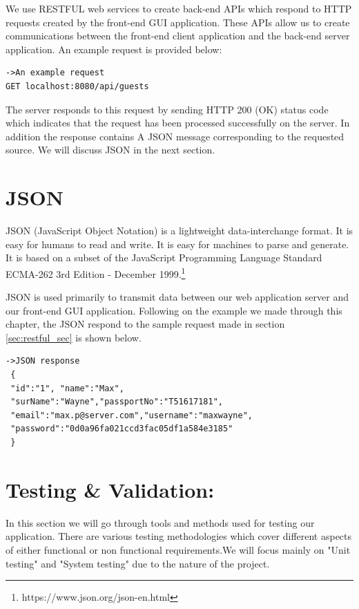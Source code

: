 We use RESTFUL web services to create back-end APIs which respond to HTTP requests created by the front-end GUI application. These APIs allow us to create communications between the front-end client application and the back-end server application. An example request is provided below:
\begin{verbatim}
->An example request
GET localhost:8080/api/guests
\end{verbatim}
The server responds to this request by sending HTTP 200 (OK) status code which indicates that the request has been processed successfully on the server. In addition the response contains A JSON message corresponding to the requested source. We will discuss JSON in the next section.



\section{JSON}
\label{sec:json_sec}
JSON (JavaScript Object Notation) is a lightweight data-interchange format. It is easy for humans to read and write. It is easy for machines to parse and generate. It is based on a subset of the JavaScript Programming Language Standard ECMA-262 3rd Edition - December 1999.\footnote{https://www.json.org/json-en.html}

JSON is used primarily to transmit data between our web application server and our front-end GUI application. Following on the example we made through this chapter, the JSON respond to the sample request made in section \ref{sec:restful_sec} is shown below.
\begin{verbatim}
->JSON response
 { 
 "id":"1", "name":"Max",
 "surName":"Wayne","passportNo":"T51617181",
 "email":"max.p@server.com","username":"maxwayne",
 "password":"0d0a96fa021ccd3fac05df1a584e3185" 
 } 
\end{verbatim}

\section{Testing \& Validation:}
\label{testing_validation}
In this section we will go through tools and methods used for testing our application. There are various testing methodologies which cover different aspects of either functional or non functional requirements.We will focus mainly on "Unit testing" and "System testing" due to the nature of the project. 


